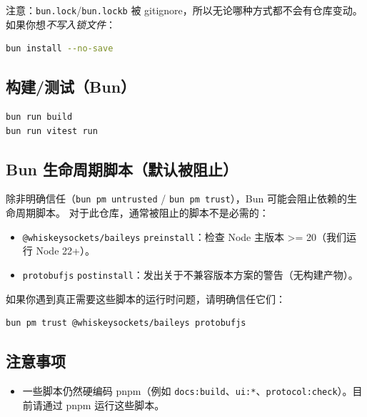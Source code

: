注意：\texttt{bun.lock}/\texttt{bun.lockb} 被 gitignore，所以无论哪种方式都不会有仓库变动。如果你想\textit{不写入锁文件}：

\begin{lstlisting}[language=bash]
bun install --no-save
\end{lstlisting}


\subsection{构建/测试（Bun）}


\begin{lstlisting}[language=bash]
bun run build
bun run vitest run
\end{lstlisting}


\subsection{Bun 生命周期脚本（默认被阻止）}


除非明确信任（\texttt{bun pm untrusted} / \texttt{bun pm trust}），Bun 可能会阻止依赖的生命周期脚本。
对于此仓库，通常被阻止的脚本不是必需的：

\begin{itemize}
  \item \texttt{@whiskeysockets/baileys} \texttt{preinstall}：检查 Node 主版本 >= 20（我们运行 Node 22+）。
  \item \texttt{protobufjs} \texttt{postinstall}：发出关于不兼容版本方案的警告（无构建产物）。
\end{itemize}


如果你遇到真正需要这些脚本的运行时问题，请明确信任它们：

\begin{lstlisting}[language=bash]
bun pm trust @whiskeysockets/baileys protobufjs
\end{lstlisting}


\subsection{注意事项}


\begin{itemize}
  \item 一些脚本仍然硬编码 pnpm（例如 \texttt{docs:build}、\texttt{ui:*}、\texttt{protocol:check}）。目前请通过 pnpm 运行这些脚本。
\end{itemize}



\clearpage

